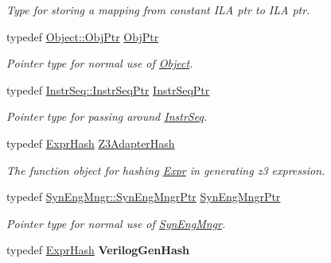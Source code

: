 \begin{DoxyCompactItemize}
\begin{DoxyCompactList}\small\item\em Type for storing a mapping from constant I\+LA ptr to I\+LA ptr. \end{DoxyCompactList}\item 
\mbox{\label{namespaceilang_adc547f597d2a58cf82dfe756fe092d86}} 
typedef \mbox{\hyperlink{classilang_1_1_object_af23d3767cfbc8cb9312281cbfa4aae48}{Object\+::\+Obj\+Ptr}} \mbox{\hyperlink{namespaceilang_adc547f597d2a58cf82dfe756fe092d86}{Obj\+Ptr}}
\begin{DoxyCompactList}\small\item\em Pointer type for normal use of \mbox{\hyperlink{classilang_1_1_object}{Object}}. \end{DoxyCompactList}\item 
\mbox{\label{namespaceilang_a61e7c382e8a666b516fc761b0ce8bff8}} 
typedef \mbox{\hyperlink{classilang_1_1_instr_seq_a37dd168ce5d95507eb7bf53455d79b80}{Instr\+Seq\+::\+Instr\+Seq\+Ptr}} \mbox{\hyperlink{namespaceilang_a61e7c382e8a666b516fc761b0ce8bff8}{Instr\+Seq\+Ptr}}
\begin{DoxyCompactList}\small\item\em Pointer type for passing around \mbox{\hyperlink{classilang_1_1_instr_seq}{Instr\+Seq}}. \end{DoxyCompactList}\item 
\mbox{\label{namespaceilang_a784e2a4ef111b96f327b76f11e86b01a}} 
typedef \mbox{\hyperlink{classilang_1_1_expr_hash}{Expr\+Hash}} \mbox{\hyperlink{namespaceilang_a784e2a4ef111b96f327b76f11e86b01a}{Z3\+Adapter\+Hash}}
\begin{DoxyCompactList}\small\item\em The function object for hashing \mbox{\hyperlink{classilang_1_1_expr}{Expr}} in generating z3 expression. \end{DoxyCompactList}\item 
\mbox{\label{namespaceilang_a42a6ed2f416c0b13bf68efd21a73c67b}} 
typedef \mbox{\hyperlink{classilang_1_1_syn_eng_mngr_acaffa3e6981472cc6f0d8d5647dc1baf}{Syn\+Eng\+Mngr\+::\+Syn\+Eng\+Mngr\+Ptr}} \mbox{\hyperlink{namespaceilang_a42a6ed2f416c0b13bf68efd21a73c67b}{Syn\+Eng\+Mngr\+Ptr}}
\begin{DoxyCompactList}\small\item\em Pointer type for normal use of \mbox{\hyperlink{classilang_1_1_syn_eng_mngr}{Syn\+Eng\+Mngr}}. \end{DoxyCompactList}\item 
\mbox{\label{namespaceilang_a6ae3529ea370d3252b9e44e20b53532e}} 
typedef \mbox{\hyperlink{classilang_1_1_expr_hash}{Expr\+Hash}} {\bfseries Verilog\+Gen\+Hash}
\end{DoxyCompactItemize}
